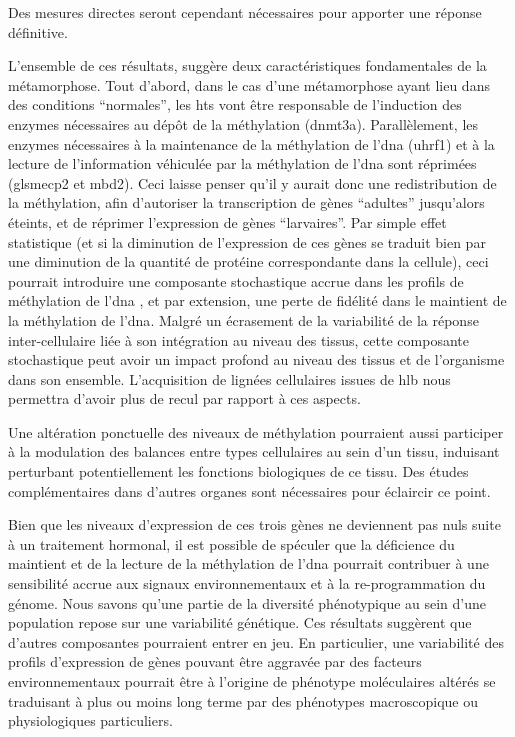 \documentclass[../main.tex]{subfiles}
\begin{document}
Des mesures directes seront cependant nécessaires pour apporter une réponse définitive.
\par
L'ensemble de ces résultats, suggère deux caractéristiques fondamentales de la métamorphose.
Tout d'abord, dans le cas d'une métamorphose ayant lieu dans des conditions ``normales'', les \glspl{ht} vont être responsable de l'induction des enzymes nécessaires au dépôt de la méthylation (\gls{dnmt3a}).
Parallèlement, les enzymes nécessaires à la maintenance de la méthylation de l'\gls{dna} (\gls{uhrf1}) et à la lecture de l'information véhiculée par la méthylation de l'\gls{dna} sont réprimées (gls{mecp2} et \gls{mbd}2).
Ceci laisse penser qu'il y aurait donc une redistribution de la méthylation, afin d’autoriser la transcription de gènes ``adultes'' jusqu'alors éteints, et de réprimer l'expression de gènes ``larvaires''.
Par simple effet statistique (et si la diminution de l'expression de ces gènes se traduit bien par une diminution de la quantité de protéine correspondante dans la cellule), ceci pourrait introduire une composante stochastique accrue dans les profils de méthylation de l'\gls{dna} \citep{Xie2011,Landan2012}, et par extension, une perte de fidélité dans le maintient de la méthylation de l'\gls{dna}.
Malgré un écrasement de la variabilité de la réponse inter-cellulaire liée à son intégration au niveau des tissus, cette composante stochastique peut avoir un impact profond au niveau des tissus et de l'organisme dans son ensemble.
L'acquisition de lignées cellulaires issues de \gls{hlb} \citep{Sinzelle2012} nous permettra d'avoir plus de recul par rapport à ces aspects.
\par
Une altération ponctuelle des niveaux de méthylation pourraient aussi participer à la modulation des balances entre types cellulaires au sein d'un tissu, induisant perturbant potentiellement les fonctions biologiques de ce tissu.
Des études complémentaires dans d'autres organes sont nécessaires pour éclaircir ce point.
\par
Bien que les niveaux d'expression de ces trois gènes ne deviennent pas nuls suite à un traitement hormonal, il est possible de spéculer que la déficience du maintient et de la lecture de la méthylation de l'\gls{dna} pourrait contribuer à une sensibilité accrue aux signaux environnementaux et à la re-programmation du génome.
Nous savons qu'une partie de la diversité phénotypique au sein d'une population repose sur une variabilité génétique.
Ces résultats suggèrent que d'autres composantes pourraient entrer en jeu.
En particulier, une variabilité des profils d’expression de gènes pouvant être aggravée par des facteurs environnementaux pourrait être à l'origine de phénotype moléculaires altérés se traduisant à plus ou moins long terme par des phénotypes macroscopique ou physiologiques particuliers.
\end{document}
